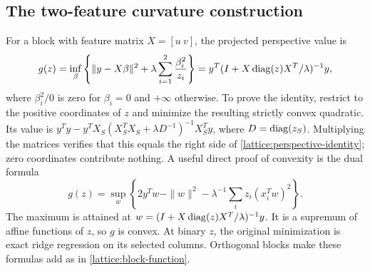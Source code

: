 \subsection{The two-feature curvature construction}
\label{app:lattice:gadget}

For a block with feature matrix $X=[u\ v]$, the projected perspective
value is
\begin{equation}
 g(z)=\inf_\beta\left\{\|y-X\beta\|^2+
                   \lambda\sum_{i=1}^2\frac{\beta_i^2}{z_i}\right\}
 =y^T(I+X\operatorname{diag}(z)X^T/\lambda)^{-1}y,
 \label{lattice:perspective-identity}
\end{equation}
where $\beta_i^2/0$ is zero for $\beta_i=0$ and $+\infty$ otherwise.
To prove the identity, restrict to the positive coordinates of $z$ and
minimize the resulting strictly convex quadratic. Its value is
$y^Ty-y^TX_S(X_S^TX_S+\lambda D^{-1})^{-1}X_S^Ty$, where
$D=\operatorname{diag}(z_S)$. Multiplying the matrices verifies that this equals the
right side of \eqref{lattice:perspective-identity}; zero coordinates
contribute nothing. A useful direct proof of convexity is the dual formula
\begin{equation*}
 g(z)=\sup_w\left\{2y^Tw-\|w\|^2-
                    \lambda^{-1}\sum_i z_i(x_i^Tw)^2\right\}.
\end{equation*}
The maximum is attained at
$w=(I+X\operatorname{diag}(z)X^T/\lambda)^{-1}y$. It is a supremum of affine functions
of $z$, so $g$ is convex. At binary $z$, the original minimization is
exact ridge regression on its selected columns. Orthogonal blocks make
these formulas add as in \eqref{lattice:block-function}.

